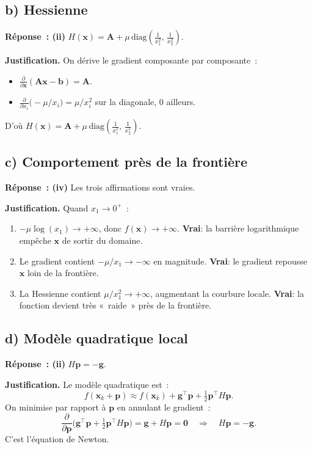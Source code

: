 \documentclass[12pt,letterpaper]{article}
\begin{document}
\subsection{b) Hessienne} %

\textbf{Réponse~: (ii)} $\displaystyle H(\mathbf{x}) = \mathbf{A} + \mu\,\text{diag}\!\left(\frac{1}{x_1^2},\, \frac{1}{x_2^2}\right)$.

\textbf{Justification.}
On dérive le gradient composante par composante~:
\begin{itemize}
  \item $\frac{\partial}{\partial \mathbf{x}}(\mathbf{A}\mathbf{x} - \mathbf{b}) = \mathbf{A}$.
  \item $\frac{\partial}{\partial x_i}\bigl(-\mu/x_i\bigr) = \mu/x_i^2$ sur la diagonale, $0$ ailleurs.
\end{itemize}
D'où $H(\mathbf{x}) = \boxed{\mathbf{A} + \mu\,\text{diag}\!\left(\frac{1}{x_1^2},\, \frac{1}{x_2^2}\right)}$.

\subsection{c) Comportement près de la frontière} %

\textbf{Réponse~: (iv)} Les trois affirmations sont vraies.

\textbf{Justification.}
Quand $x_1 \to 0^+$~:
\begin{enumerate}
  \item[(i)] $-\mu\log(x_1) \to +\infty$, donc $f(\mathbf{x}) \to +\infty$. \textbf{Vrai}: la barrière logarithmique empêche $\mathbf{x}$ de sortir du domaine.
  \item[(ii)] Le gradient contient $-\mu/x_1 \to -\infty$ en magnitude. \textbf{Vrai}: le gradient repousse $\mathbf{x}$ loin de la frontière.
  \item[(iii)] La Hessienne contient $\mu/x_1^2 \to +\infty$, augmentant la courbure locale. \textbf{Vrai}: la fonction devient très «~raide~» près de la frontière.
\end{enumerate}

\subsection{d) Modèle quadratique local} %

\textbf{Réponse~: (ii)} $H\mathbf{p} = -\mathbf{g}$.

\textbf{Justification.}
Le modèle quadratique est~:
\[
f(\mathbf{x}_k + \mathbf{p}) \approx f(\mathbf{x}_k) + \mathbf{g}^\top\mathbf{p} + \tfrac{1}{2}\mathbf{p}^\top H\mathbf{p}.
\]
On minimise par rapport à $\mathbf{p}$ en annulant le gradient~:
\[
\frac{\partial}{\partial \mathbf{p}}\bigl(\mathbf{g}^\top\mathbf{p} + \tfrac{1}{2}\mathbf{p}^\top H\mathbf{p}\bigr) = \mathbf{g} + H\mathbf{p} = \mathbf{0}
\quad\Longrightarrow\quad
\boxed{H\mathbf{p} = -\mathbf{g}}.
\]
C'est l'équation de Newton.
\end{document}
